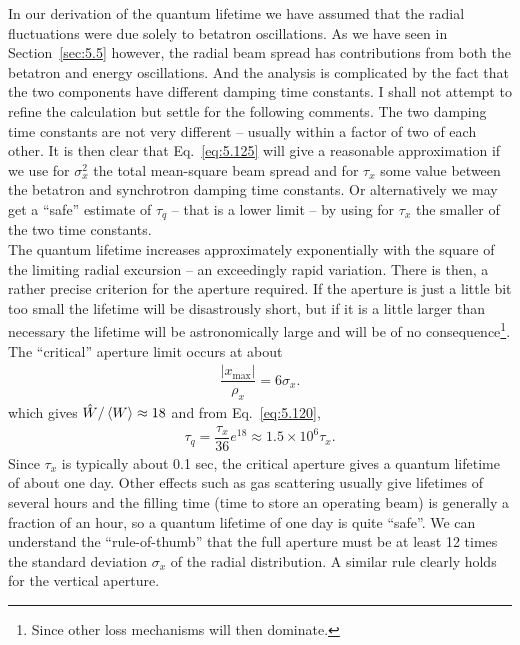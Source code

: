 In our derivation of the quantum lifetime we have assumed that the radial fluctuations were due solely to betatron oscillations. As we have seen in Section~\ref{sec:5.5} however, the radial beam spread has contributions from both the betatron and energy oscillations. And the analysis is complicated by the fact that the two components have different damping time constants. I shall not attempt to refine the calculation but settle for the following comments. The two damping time constants are not very different -- usually within a factor of two of each other. It is then clear that Eq.~\eqref{eq:5.125} will give a reasonable approximation if we use for $\sigma_x^2$ the total mean-square beam spread and for $\tau_x$ some value between the betatron and synchrotron damping time constants. Or alternatively we may get a ``safe'' estimate of $\tau_q$ -- that is a lower limit -- by using for $\tau_x$ the smaller of the two time constants.\\
The quantum lifetime increases approximately exponentially with the square of the limiting radial excursion -- an exceedingly rapid variation. There is then, a rather precise criterion
 for the aperture required. If the aperture is just a little bit too small the lifetime will be disastrously short, but if it is a little larger than necessary the lifetime will be astronomically large and will be of no consequence\footnote{Since other loss mechanisms
 will then dominate.}. The ``critical'' aperture limit occurs at about
\begin{align}
	\dfrac{|x_\text{max}|}{\rho_x} = 6\sigma_x.
\end{align}
which gives $\hat{W}/\left< W \right> \approx 18$ and from Eq.~\eqref{eq:5.120},
\begin{align}
	\tau_q = \dfrac{\tau_x}{36} e^{18} \approx 1.5 \times 10^6 \tau_x.
\end{align}
Since $\tau_x$ is typically about 0.1 sec, the critical aperture gives a quantum lifetime
of about one day. Other effects such as gas scattering usually give lifetimes of several hours and the filling time (time to store an operating beam) is generally a fraction of an hour, so a quantum lifetime of one day is quite ``safe''. We can understand the ``rule-of-thumb'' that the full aperture must be at least 12 times the standard deviation $\sigma_x$ of the radial distribution. A similar rule clearly holds for the vertical aperture.
